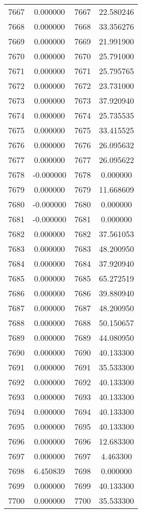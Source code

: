 \documentclass[12pt]{article}
\begin{document}
\begin{longtable}{@{}cccc@{}}
7667 & 0.000000 & 7667 & 22.580246 \\
7668 & 0.000000 & 7668 & 33.356276 \\
7669 & 0.000000 & 7669 & 21.991900 \\
7670 & 0.000000 & 7670 & 25.791000 \\
7671 & 0.000000 & 7671 & 25.795765 \\
7672 & 0.000000 & 7672 & 23.731000 \\
7673 & 0.000000 & 7673 & 37.920940 \\
7674 & 0.000000 & 7674 & 25.735535 \\
7675 & 0.000000 & 7675 & 33.415525 \\
7676 & 0.000000 & 7676 & 26.095632 \\
7677 & 0.000000 & 7677 & 26.095622 \\
7678 & -0.000000 & 7678 & 0.000000 \\
7679 & 0.000000 & 7679 & 11.668609 \\
7680 & -0.000000 & 7680 & 0.000000 \\
7681 & -0.000000 & 7681 & 0.000000 \\
7682 & 0.000000 & 7682 & 37.561053 \\
7683 & 0.000000 & 7683 & 48.200950 \\
7684 & 0.000000 & 7684 & 37.920940 \\
7685 & 0.000000 & 7685 & 65.272519 \\
7686 & 0.000000 & 7686 & 39.880940 \\
7687 & 0.000000 & 7687 & 48.200950 \\
7688 & 0.000000 & 7688 & 50.150657 \\
7689 & 0.000000 & 7689 & 44.080950 \\
7690 & 0.000000 & 7690 & 40.133300 \\
7691 & 0.000000 & 7691 & 35.533300 \\
7692 & 0.000000 & 7692 & 40.133300 \\
7693 & 0.000000 & 7693 & 40.133300 \\
7694 & 0.000000 & 7694 & 40.133300 \\
7695 & 0.000000 & 7695 & 40.133300 \\
7696 & 0.000000 & 7696 & 12.683300 \\
7697 & 0.000000 & 7697 & 4.463300 \\
7698 & 6.450839 & 7698 & 0.000000 \\
7699 & 0.000000 & 7699 & 40.133300 \\
7700 & 0.000000 & 7700 & 35.533300 \\

\end{longtable}
\end{document}
